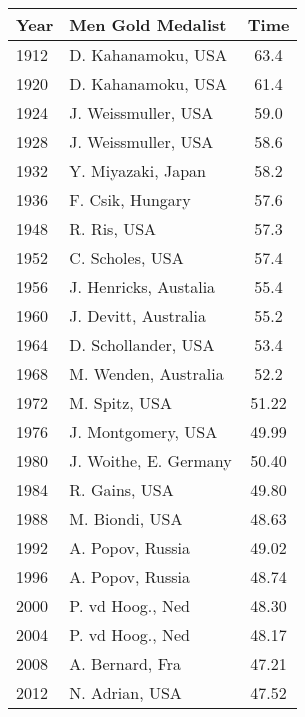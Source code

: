 \documentclass[a4paper, 11pt]{article}
\begin{document}
\maketitle %



\\
\vspace{0.5cm}

\begin{multicols}{2}
\begin{tabular}{ | l | l | c |}
    \hline
    Year    &     Men Gold Medalist         & Time \\
    \hline
    1912    &    D. Kahanamoku, USA     &    63.4 \\
    1920    &    D. Kahanamoku, USA     &    61.4 \\
    1924    &    J. Weissmuller, USA    &    59.0 \\
    1928    &    J. Weissmuller, USA    &    58.6 \\
    1932    &    Y. Miyazaki, Japan     &    58.2 \\
    1936    &    F. Csik, Hungary       &    57.6 \\
    1948    &    R. Ris, USA            &    57.3 \\
    1952    &    C. Scholes, USA        &    57.4 \\
    1956    &    J. Henricks, Austalia  &    55.4 \\
    1960    &    J. Devitt, Australia   &    55.2 \\
    1964    &    D. Schollander, USA    &    53.4 \\
    1968    &    M. Wenden, Australia   &    52.2 \\
    1972    &    M. Spitz, USA          &    51.22 \\
    1976    &    J. Montgomery, USA     &    49.99 \\
    1980    &    J. Woithe, E. Germany  &    50.40 \\
    1984    &    R. Gains, USA          &    49.80 \\
    1988    &    M. Biondi, USA         &    48.63 \\
    1992    &    A. Popov, Russia       &    49.02 \\
    1996    &    A. Popov, Russia       &    48.74 \\
    2000    &    P. vd Hoog., Ned       &    48.30  \\
    2004    &    P. vd Hoog., Ned       &    48.17  \\
    2008    &    A. Bernard, Fra        &    47.21 \\
		2012		&    N. Adrian, USA         & 	47.52 \\
    \hline
    \end{tabular}


\end{multicols}
\end{document}
